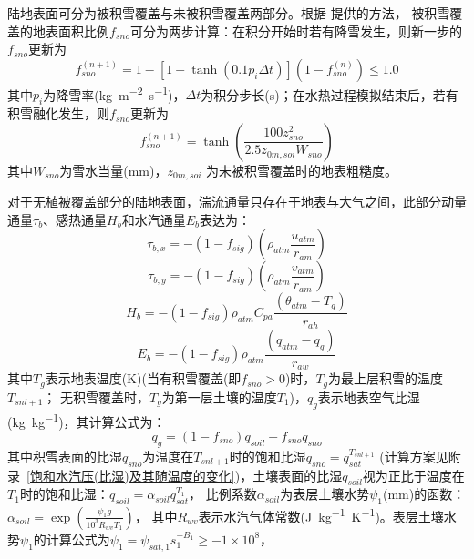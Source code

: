 陆地表面可分为被积雪覆盖与未被积雪覆盖两部分。根据 \citet{swenson2012new}提供的方法，
被积雪覆盖的地表面积比例$f_{sno}$可分为两步计算：在积分开始时若有降雪发生，则新一步的$f_{sno}$更新为
\begin{equation}
f_{{sno }}^{(n+1)}=1-\left[1-\tanh\left(0.1 p_{i} \Delta t\right)\right]\left(1-f_{{sno }}^{(n)}\right) \leq 1.0
\end{equation}
其中$p_i$为降雪率(\unit{kg.m^{-2}.s^{-1}})，$\Delta t$为积分步长(s)；在水热过程模拟结束后，若有积雪融化发生，则$f_{sno}$更新为
\begin{equation}
f_{sno}^{(n+1)}=\tanh{\left(\frac{100 z_{s n o}^{2}}{2.5 z_{0 m, s o i} W_{sno}}\right)}
\end{equation}
其中$W_{sno}$为雪水当量(mm)，$z_{0m,soi}$ 为未被积雪覆盖时的地表粗糙度。

对于无植被覆盖部分的陆地表面，湍流通量只存在于地表与大气之间，此部分动量通量$\tau_b$、感热通量$H_b$和水汽通量$E_b$表达为：
\begin{equation}\label{taub_x}
\tau_{b, x}=-\left(1-f_{sig}\right)\left(\rho_{atm} \frac{u_{atm}}{r_{a m}}\right)
\end{equation}
\begin{equation}\label{taub_y}
\tau_{b, y}=-\left(1-f_{sig}\right)\left(\rho_{atm} \frac{v_{atm}}{r_{a m}}\right)
\end{equation}
\begin{equation}\label{Hb}
H_{b}=-\left(1-f_{sig}\right) \rho_{atm} C_{p a} \frac{\left(\theta_{atm}-T_{g}\right)}{r_{a h}}
\end{equation}
\begin{equation}\label{Eb}
E_{b}=-\left(1-f_{sig}\right) \rho_{atm} \frac{\left(q_{atm}-q_{g}\right)}{r_{a w}}
\end{equation}
其中$T_g$表示地表温度(K)(当有积雪覆盖(即$f_{sno}>0$)时，$T_g$为最上层积雪的温度$T_{snl+1}$；
无积雪覆盖时，$T_g$为第一层土壤的温度$T_1$)，$q_g$表示地表空气比湿(\unit{kg.kg^{-1}})，其计算公式为：
\begin{equation}\label{qg}
q_{g}=\left(1-f_{{sno }}\right) q_{{soil }}+f_{{sno }} q_{{sno }}
\end{equation}
其中积雪表面的比湿$q_{sno}$为温度在$T_{snl+1}$时的饱和比湿$q_{sno}=q_{sat}^{T_{snl+1}}$
(计算方案见附录~\ref{饱和水汽压(比湿)及其随温度的变化})，土壤表面的比湿$q_{soil}$视为正比于温度在$T_1$时的饱和比湿：$q_{soil}=\alpha_{soil}q_{sat}^{T_1}$，
比例系数$\alpha_{soil}$为表层土壤水势$\psi_1$(mm)的函数\citep{philip1957theory}：$\alpha_{soil}=\exp \left(\frac{\psi_1g}{{10}^3R_{wv}T_1}\right)$，
其中$R_{wv}$表示水汽气体常数(\unit{J.kg^{-1}.K^{-1}})。表层土壤水势$\psi_1$的计算公式为$\psi_1=\psi_{sat,1}s_1^{-B_1}\geq-1\times{10}^8$，
